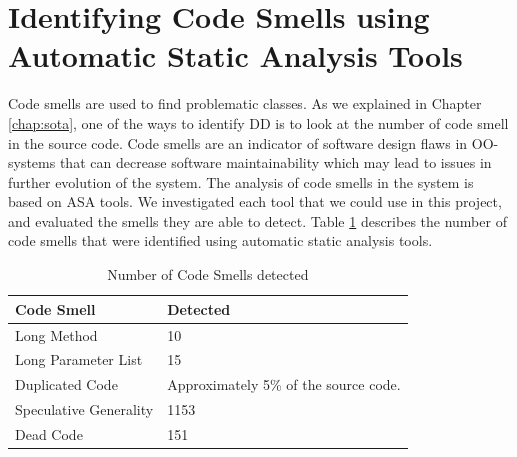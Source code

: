 







\section{Identifying Code Smells using Automatic Static Analysis Tools}
\label{sub:code_smell_detection}
Code smells are used to find problematic classes. As we explained in Chapter \ref{chap:sota}, one of the ways to identify DD is to look at the number of code smell in the source code. Code smells are an indicator of software design flaws in OO-systems that can decrease software maintainability which may lead to issues in further evolution of the system\cite{olbrich2009evolution}. The analysis of code smells in the system is based on ASA tools. We investigated each tool that we could use in this project, and evaluated the smells they are able to detect. Table \ref{tab:identifiedCodeSmell} describes the number of code smells that were identified using automatic static analysis tools.

\begin{table}[ht!]
\centering
\caption{Number of Code Smells detected}
\label{tab:identifiedCodeSmell}
\begin{tabular}{|l|p{3cm}|}
\hline
\textbf{Code Smell}                           & \textbf{Detected}    \\ \hline
Long Method                                   & 10          \\ \hline
Long Parameter List                           & 15          \\ \hline
Duplicated Code                               & Approximately 5\% of the source code.  \\ \hline
Speculative Generality                        & 1153      \\ \hline
Dead Code 									  & 151 \\ \hline
\end{tabular}
\end{table}

